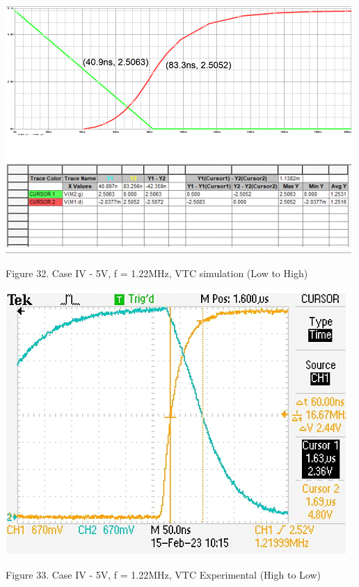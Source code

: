 \documentclass[conference]{IEEEtran}
\begin{document}
\begin{center}
    \centerline{\includegraphics[scale = 0.65]{figures/case4_results_LH.png}}
    Figure 32. Case IV - 5V, f = 1.22MHz, VTC simulation (Low to High)
\end{center}

\begin{center}
    \centerline{\includegraphics[scale = 0.6]{figures/case4_HL_experimental.png}}
    Figure 33. Case IV - 5V, f = 1.22MHz, VTC Experimental (High to Low)
\end{center}
\end{document}
